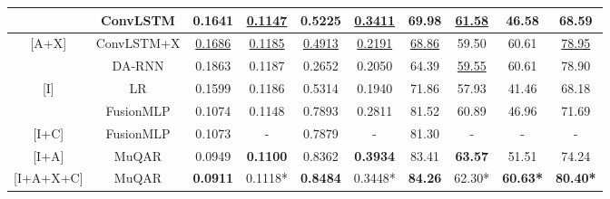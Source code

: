\documentclass{article}
\begin{document}
\begin{table*}
\begin{tabular}{cc|cc|cc|ccc|c}
    &
    ConvLSTM & 0.1641 & \underline{0.1147} & 0.5225 & \underline{0.3411} & 69.98 & \underline{61.58} & 46.58 & 68.59 \\
    
    \midrule
    
    \multirow{2}{*}{[A+X]} & ConvLSTM+X & \underline{0.1686} & \underline{0.1185} & \underline{0.4913} & \underline{0.2191} & \underline{68.86} & 59.50 & 60.61 & \underline{78.95} \\
    & DA-RNN & 0.1863 & 0.1187 & 0.2652 & 0.2050 & 64.39 & \underline{59.55} & 60.61 & 78.90 \\
    
    \midrule
    
    \multirow{2}{*}{[I]} &
    LR & 0.1599 & 0.1186 & 0.5314 & 0.1940 & 71.86 & 57.93 & 41.46 & 68.18 \\
    
    &
    FusionMLP & 0.1074 & 0.1148 & 0.7893 & 0.2811 & 81.52 & 60.89 & 46.96 & 71.69 \\
    
    \midrule
    
    [I+C] & FusionMLP & 0.1073 & - & 0.7879 & - & 81.30 & - & - & - \\
        
    \midrule
    
    [I+A] &
    MuQAR & 0.0949 & \textbf{0.1100} & 0.8362 & \textbf{0.3934} & 83.41 & \textbf{63.57} & 51.51 & 74.24 \\
    
    \midrule
    
    [I+A+X+C] &
    MuQAR & \textbf{0.0911} & 0.1118* & \textbf{0.8484} & 0.3448* & \textbf{84.26} & 62.30* & \textbf{60.63*} & \textbf{80.40*} \\
    
    

    \bottomrule
  \end{tabular}
\end{table*}
\end{document}
